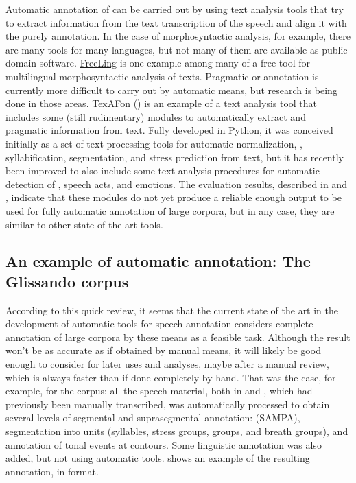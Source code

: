 \documentclass[output=paper]{langsci/langscibook}
\begin{document}
Automatic annotation of  can be carried out by using text analysis tools that try to extract information from the text transcription of the speech and align it with the purely  annotation. In the case of morphosyntactic analysis, for example, there are many tools for many languages, but not many of them are available as public domain software. \href{http://nlp.lsi.upc.edu/freeling/}{FreeLing} \citep{Carreras2004} is one example among many of a free tool for multilingual morphosyntactic analysis of texts. Pragmatic or  annotation is currently more difficult to carry out by automatic means, but research is being done in those areas. TexAFon (\citealt{Garrido2014}) is an example of a text analysis tool that includes some (still rudimentary) modules to automatically extract  and pragmatic information from text. Fully developed in Python, it was conceived initially as a set of text processing tools for automatic normalization, , syllabification,  segmentation, and stress prediction from text, but it has recently been improved to also include some text analysis procedures for automatic detection of , speech acts, and emotions. The evaluation results, described in \citet{Garrido2014} and \citet{Kolz2014}, indicate that these modules do not yet produce a reliable enough output to be used for fully automatic annotation of large corpora, but in any case, they are similar to other state-of-the art tools.

\subsection{An example of automatic annotation: The Glissando corpus}

According to this quick review, it seems that the current state of the art in the development of automatic tools for speech annotation considers complete annotation of large corpora by these means as a feasible task. Although the result won’t be as accurate as if obtained by manual means, it will likely be good enough to consider for later uses and analyses, maybe after a manual review, which is always faster than if done completely by hand. That was the case, for example, for the  corpus: all the speech material, both in  and , which had previously been manually transcribed, was automatically processed to obtain several levels of segmental and suprasegmental annotation:  (SAMPA), segmentation into  units (syllables, stress groups,  groups, and breath groups), and annotation of tonal events at  contours. Some linguistic annotation was also added, but not using automatic tools.  shows an example of the resulting annotation, in   format.
\end{document}
